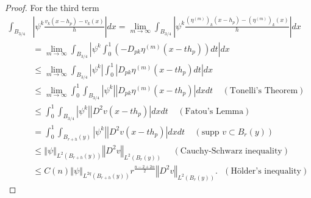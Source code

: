 \documentclass[12pt,leqno]{amsart}%
\theoremstyle{plain}
\numberwithin{equation}{section}
\theoremstyle{definition}
\begin{document}
\begin{proof}
For the third term
\begin{align}
\int_{B_{3/4}}  &  \left\vert \psi^{k}\frac{v_{k}(x-h_{p})-v_{k}(x)}%
{h}\right\vert dx=\lim_{m\rightarrow\infty}\int_{B_{3/4}}\left\vert \psi
^{k}\frac{\left(  \eta^{(m)}\right)  _{k}(x-h_{p})-\left(  \eta^{(m)}\right)
_{k}(x)}{h}\right\vert dx\nonumber\\
&  =\lim_{m\rightarrow\infty}\int_{B_{3/4}}\left\vert \psi^{k}\int_{0}%
^{1}\left(  -D_{pk}\eta^{(m)}(x-th_{p})\right)  dt\right\vert dx\nonumber\\
&  \leq\lim_{m\rightarrow\infty}\int_{B_{3/4}}\left\vert \psi^{k}\right\vert
\int_{0}^{1}\left\vert D_{pk}\eta^{(m)}(x-th_{p})dt\right\vert dx\nonumber\\
&  \leq\lim_{m\rightarrow\infty}\int_{0}^{1}\int_{B_{3/4}}\left\vert \psi
^{k}\right\vert \left\vert D_{pk}\eta^{(m)}(x-th_{p})\right\vert
dxdt\ \ \ \ \ (\mbox{Tonelli's Theorem})\nonumber\\
&  \leq\int_{0}^{1}\int_{B_{3/4}}\left\vert \psi^{k}\right\vert \left\vert
D^{2}v(x-th_{p})\right\vert dxdt\ \ \ \ \ (\mbox{Fatou's Lemma})\nonumber\\
&  =\int_{0}^{1}\int_{B_{r+h}(y)}\left\vert \psi^{k}\right\vert \left\vert
D^{2}v(x-th_{p})\right\vert
dxdt\ \ \ \ \ (\mbox{supp $v\subset B_r(y)$})\nonumber\\
&  \leq\left\Vert \psi\right\Vert _{L^{2}(B_{r+h}(y))}\left\Vert
D^{2}v\right\Vert _{L^{2}(B_{r}(y))}%
\ \ \ \ \ \ (\mbox{Cauchy-Schwarz inequality})\nonumber\\
&  \leq C(n)\left\Vert \psi\right\Vert _{L^{2q}(B_{r+h}(y))}r^{\frac
{n-2+2\alpha}{2}}\left\Vert D^{2}v\right\Vert _{L^{2}(B_{r}(y))}%
.\ \ \ (\mbox{H\"older's inequality}) \label{eq39}%
\end{align}


\begin{comment}
\begin{align}
\int_{B_{1/2}}\left|\psi^{k}\frac{v_{k}(x-h_{p})-v_{k}(x)}{h}\right|dx &  =\lim
_{m\rightarrow\infty}\int_{B_{1/2}}\left|\psi^{k}\frac{\left(  \eta^{(m)}\right)
_{k}(x-h_{p})-\left(  \eta^{(m)}\right)  _{k}(x)}{h}\right|dx\nonumber\\
&  =\lim_{m\rightarrow\infty}\int_{B_{1/2}}\left |\psi^{k}\int_{0}^{1}\left(
-D_{pk}\eta^{(m)}(x-th_{p})\right) \right| dtdx\nonumber\\
&  \leq\lim_{m\rightarrow\infty}\int_{0}^{1}\left\Vert \psi^k\right\Vert
_{L^{2}(B_{1})}\left\Vert D_{pk}\eta^{(m)}\right\Vert _{L^{2}(B_{1/2}%
)}dt\nonumber\\
&  \leq\lim_{m\rightarrow\infty}\left\Vert \psi^k\right\Vert _{L^{2}(B_{1}%
)}\left\Vert D^{2}v\right\Vert _{L^{2}(B_{r}(y))}\nonumber\\
&  \leq\left(  \int_{B_{r}(y)}|\psi^k|^{2q}dx\right)  ^{\frac{1}{q}}%
r^{\frac{n-2+2\alpha}{2}}\left\Vert D^{2}v\right\Vert _{L^{2}(B_{r}(y)
)}\label{eq39}%
\end{align}
for the same $q$ as above.
\end{comment}



\end{proof}
\end{document}
